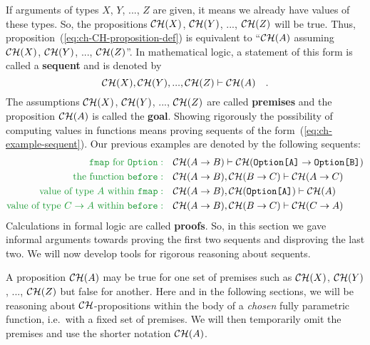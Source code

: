 If arguments of types $X$, $Y$, ..., $Z$ are given, it means we
already have values of these types. So, the propositions ${\cal CH}(X)$,
${\cal CH}(Y)$, ..., ${\cal CH}(Z)$ will be true. Thus, proposition~(\ref{eq:ch-CH-proposition-def})
is equivalent to \textsf{``}${\cal CH}(A)$ assuming ${\cal CH}(X)$, ${\cal CH}(Y)$,
..., ${\cal CH}(Z)$\textsf{''}. In mathematical logic, a statement of this
form is called a \textbf{sequent} and is denoted by
\begin{equation}
{\cal CH}(X),{\cal CH}(Y),...,{\cal CH}(Z)\vdash{\cal CH}(A)\quad.\label{eq:ch-example-sequent}
\end{equation}
The assumptions ${\cal CH}(X)$, ${\cal CH}(Y)$, ..., ${\cal CH}(Z)$
are called \textbf{premises} and
the proposition ${\cal CH}(A)$ is called the \textbf{goal}.
Showing rigorously the possibility of computing values in functions
means proving sequents of the form~(\ref{eq:ch-example-sequent}).
Our previous examples are denoted by the following sequents:
\begin{align*}
{\color{greenunder}\text{\texttt{fmap} for \texttt{Option}}:}\quad & {\cal CH}(A\rightarrow B)\vdash{\cal CH}(\text{\texttt{Option[A]}}\rightarrow\text{\texttt{Option[B]}})\\
{\color{greenunder}\text{the function \texttt{before}}:}\quad & {\cal CH}(A\rightarrow B),{\cal CH}(B\rightarrow C)\vdash{\cal CH}(A\rightarrow C)\\
{\color{greenunder}\text{value of type }A\text{ within \texttt{fmap}}:}\quad & {\cal CH}(A\rightarrow B),{\cal CH}(\text{\texttt{Option[A]}})\vdash{\cal CH}(A)\\
{\color{greenunder}\text{value of type }C\rightarrow A\text{ within \texttt{before}}:}\quad & {\cal CH}(A\rightarrow B),{\cal CH}(B\rightarrow C)\vdash{\cal CH}(C\rightarrow A)
\end{align*}
Calculations in formal logic are called \textbf{proofs}.
So, in this section we gave informal arguments towards proving the
first two sequents and disproving the last two. We will now develop
tools for rigorous reasoning about sequents.

A proposition ${\cal CH}(A)$ may be true for one set of premises
such as ${\cal CH}(X)$, ${\cal CH}(Y)$, ..., ${\cal CH}(Z)$ but
false for another. Here and in the following sections, we will be
reasoning about ${\cal CH}$-propositions within the body of a \emph{chosen}
fully parametric function, i.e.~with a fixed set of premises. We
will then temporarily omit the premises and use the shorter notation
${\cal CH}(A)$.

